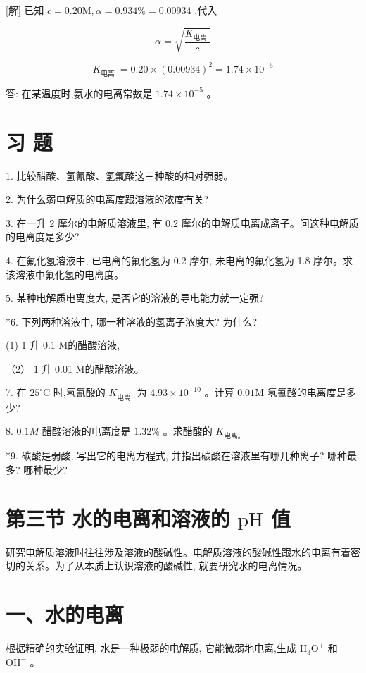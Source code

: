 \documentclass[10pt]{article}
\begin{document}
[解] 已知 \(c = {0.20}\mathrm{M},\alpha = {0.934}\% = {0.00934}\) ,代入

\[
\alpha = \sqrt{\frac{{K}_{\text{电离 }}}{c}}
\]

\[
{K}_{\text{电离 }} = {0.20} \times {\left( {0.00934}\right) }^{2} = {1.74} \times {10}^{-5}
\]

答: 在某温度时,氨水的电离常数是 \({1.74} \times {10}^{-5}\) 。

\section*{习 题}

1. 比较醋酸、氢氰酸、氢氟酸这三种酸的相对强弱。

2. 为什么弱电解质的电离度跟溶液的浓度有关?

3. 在一升 2 摩尔的电解质溶液里, 有 0.2 摩尔的电解质电离成离子。问这种电解质的电离度是多少?

4. 在氟化氢溶液中, 已电离的氟化氢为 0.2 摩尔, 未电离的氟化氢为 1.8 摩尔。求该溶液中氟化氢的电离度。

5. 某种电解质电离度大, 是否它的溶液的导电能力就一定强?

*6. 下列两种溶液中, 哪一种溶液的氢离子浓度大? 为什么?

(1) 1 升 0.1 M的醋酸溶液,

（2） 1 升 0.01 M的醋酸溶液。

7. 在 \({25}^{ \circ }\mathrm{C}\) 时,氢氰酸的 \({K}_{\text{电离 }}\) 为 \({4.93} \times {10}^{-{10}}\) 。计算 \({0.01}\mathrm{M}\) 氢氰酸的电离度是多少?

8. \({0.1M}\) 醋酸溶液的电离度是 \({1.32}\%\) 。求醋酸的 \({K}_{\text{电离。}}\)

*9. 碳酸是弱酸, 写出它的电离方程式, 并指出碳酸在溶液里有哪几种离子? 哪种最多? 哪种最少?

\section*{第三节 水的电离和溶液的 \(\mathrm{{pH}}\) 值}

研究电解质溶液时往往涉及溶液的酸碱性。电解质溶液的酸碱性跟水的电离有着密切的关系。为了从本质上认识溶液的酸碱性, 就要研究水的电离情况。

\section*{一、水的电离}

根据精确的实验证明, 水是一种极弱的电解质, 它能微弱地电离,生成 \({\mathrm{H}}_{3}{\mathrm{O}}^{ + }\) 和 \({\mathrm{{OH}}}^{ - }\) 。
\end{document}
